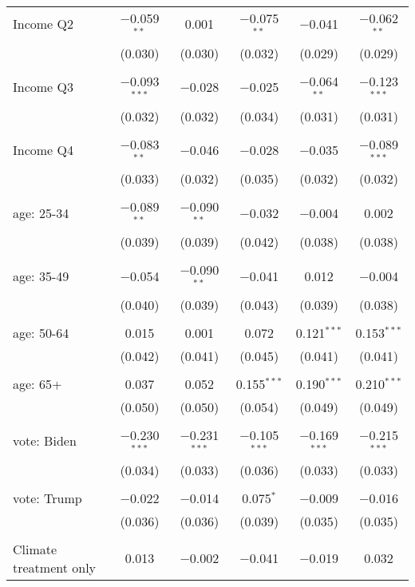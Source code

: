\begin{tabular}{@{\extracolsep{5pt}}lccccc}
 Income Q2 & $-$0.059$^{**}$ & 0.001 & $-$0.075$^{**}$ & $-$0.041 & $-$0.062$^{**}$ \\ 
  & (0.030) & (0.030) & (0.032) & (0.029) & (0.029) \\ 
  & & & & & \\ 
 Income Q3 & $-$0.093$^{***}$ & $-$0.028 & $-$0.025 & $-$0.064$^{**}$ & $-$0.123$^{***}$ \\ 
  & (0.032) & (0.032) & (0.034) & (0.031) & (0.031) \\ 
  & & & & & \\ 
 Income Q4 & $-$0.083$^{**}$ & $-$0.046 & $-$0.028 & $-$0.035 & $-$0.089$^{***}$ \\ 
  & (0.033) & (0.032) & (0.035) & (0.032) & (0.032) \\ 
  & & & & & \\ 
 age: 25-34 & $-$0.089$^{**}$ & $-$0.090$^{**}$ & $-$0.032 & $-$0.004 & 0.002 \\ 
  & (0.039) & (0.039) & (0.042) & (0.038) & (0.038) \\ 
  & & & & & \\ 
 age: 35-49 & $-$0.054 & $-$0.090$^{**}$ & $-$0.041 & 0.012 & $-$0.004 \\ 
  & (0.040) & (0.039) & (0.043) & (0.039) & (0.038) \\ 
  & & & & & \\ 
 age: 50-64 & 0.015 & 0.001 & 0.072 & 0.121$^{***}$ & 0.153$^{***}$ \\ 
  & (0.042) & (0.041) & (0.045) & (0.041) & (0.041) \\ 
  & & & & & \\ 
 age: 65+ & 0.037 & 0.052 & 0.155$^{***}$ & 0.190$^{***}$ & 0.210$^{***}$ \\ 
  & (0.050) & (0.050) & (0.054) & (0.049) & (0.049) \\ 
  & & & & & \\ 
 vote: Biden & $-$0.230$^{***}$ & $-$0.231$^{***}$ & $-$0.105$^{***}$ & $-$0.169$^{***}$ & $-$0.215$^{***}$ \\ 
  & (0.034) & (0.033) & (0.036) & (0.033) & (0.033) \\ 
  & & & & & \\ 
 vote: Trump & $-$0.022 & $-$0.014 & 0.075$^{*}$ & $-$0.009 & $-$0.016 \\ 
  & (0.036) & (0.036) & (0.039) & (0.035) & (0.035) \\ 
  & & & & & \\ 
 Climate treatment only & 0.013 & $-$0.002 & $-$0.041 & $-$0.019 & 0.032 \\ 

\end{tabular}
